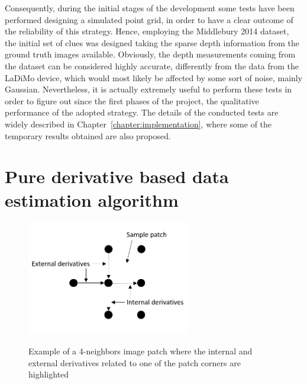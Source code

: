 Consequently, during the initial stages of the development some tests have been performed designing a simulated point grid, in order to have a clear outcome of the reliability of this strategy.
Hence, employing the Middlebury 2014 dataset, the initial set of clues was designed taking the sparse depth information from the ground truth images available. 
Obviously, the depth measurements coming from the dataset can be considered highly accurate, differently from the data from the LaDiMo device, which would most likely be affected by some sort of noise, mainly Gaussian. 
Nevertheless, it is actually extremely useful to perform these tests in order to figure out since the first phases of the project, the qualitative performance of the adopted strategy.
The details of the conducted tests are widely described in Chapter~\ref{chapter:implementation}, where some of the temporary results obtained are also proposed.

\section{Pure derivative based data estimation algorithm}
\label{section:deriv-based-algorithm}

\begin{figure}[t]
	\begin{center}
		{\includegraphics[width=.8\textwidth, height= 5cm, keepaspectratio]{images/sample-patch-derivative.png}}
\caption{Example of a 4-neighbors image patch where the internal and external derivatives related to one of the patch corners are highlighted}
\label{fig:example-patch-derivative}
	\end{center}
\end{figure}

